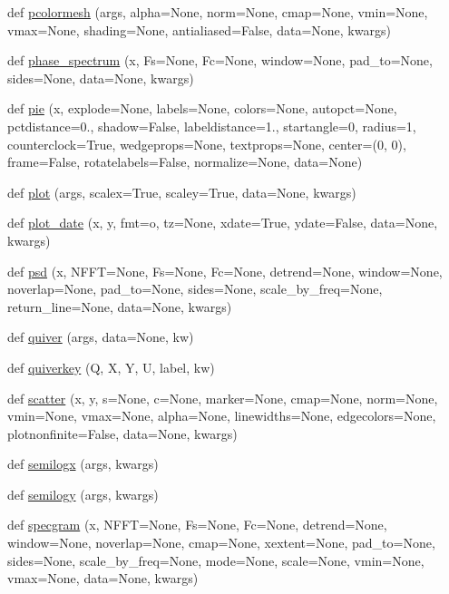 \begin{DoxyCompactItemize}
\item 
def \hyperlink{namespacematplotlib_1_1pyplot_a07edb9e0597e5c40f44b1f6c94404928}{pcolormesh} (args, alpha=None, norm=None, cmap=None, vmin=None, vmax=None, shading=None, antialiased=False, data=None, kwargs)
\item 
def \hyperlink{namespacematplotlib_1_1pyplot_adab4a177ba48fb8074247030fbca3955}{phase\+\_\+spectrum} (x, Fs=None, Fc=None, window=None, pad\+\_\+to=None, sides=None, data=None, kwargs)
\item 
def \hyperlink{namespacematplotlib_1_1pyplot_a6e4f7a9e7985f7fbf9bac51ddd9755d2}{pie} (x, explode=None, labels=None, colors=None, autopct=None, pctdistance=0., shadow=False, labeldistance=1., startangle=0, radius=1, counterclock=True, wedgeprops=None, textprops=None, center=(0, 0), frame=False, rotatelabels=False, normalize=None, data=None)
\item 
def \hyperlink{namespacematplotlib_1_1pyplot_a3e6e3cc751f5781e86ee3058e44b3d1c}{plot} (args, scalex=True, scaley=True, data=None, kwargs)
\item 
def \hyperlink{namespacematplotlib_1_1pyplot_a2557ff424a99fdae5bc63c1b4fc847b6}{plot\+\_\+date} (x, y, fmt=\textquotesingle{}o\textquotesingle{}, tz=None, xdate=True, ydate=False, data=None, kwargs)
\item 
def \hyperlink{namespacematplotlib_1_1pyplot_ace852c1c661edc5f793c2a53f192c707}{psd} (x, N\+F\+FT=None, Fs=None, Fc=None, detrend=None, window=None, noverlap=None, pad\+\_\+to=None, sides=None, scale\+\_\+by\+\_\+freq=None, return\+\_\+line=None, data=None, kwargs)
\item 
def \hyperlink{namespacematplotlib_1_1pyplot_a94c1ec9ca6263cecbb04c1e7cd4c72cd}{quiver} (args, data=None, kw)
\item 
def \hyperlink{namespacematplotlib_1_1pyplot_a727a3eaa0eb90542e7b054366f88b39e}{quiverkey} (Q, X, Y, U, label, kw)
\item 
def \hyperlink{namespacematplotlib_1_1pyplot_aad672b36d4106396e90d49c74858631a}{scatter} (x, y, s=None, c=None, marker=None, cmap=None, norm=None, vmin=None, vmax=None, alpha=None, linewidths=None, edgecolors=None, plotnonfinite=False, data=None, kwargs)
\item 
def \hyperlink{namespacematplotlib_1_1pyplot_aaa0061319311fba269aa0e85b1ca2bfc}{semilogx} (args, kwargs)
\item 
def \hyperlink{namespacematplotlib_1_1pyplot_a7ac3267fdd71e914cb042382078ea602}{semilogy} (args, kwargs)
\item 
def \hyperlink{namespacematplotlib_1_1pyplot_af49ef35beefd4f81f26fb8021a640e53}{specgram} (x, N\+F\+FT=None, Fs=None, Fc=None, detrend=None, window=None, noverlap=None, cmap=None, xextent=None, pad\+\_\+to=None, sides=None, scale\+\_\+by\+\_\+freq=None, mode=None, scale=None, vmin=None, vmax=None, data=None, kwargs)

\end{DoxyCompactItemize}

